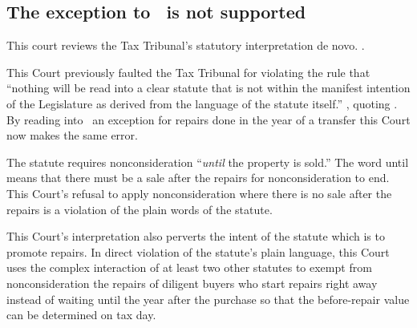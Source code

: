 \documentclass[12pt,\documentclassflag]{michiganCourtOfAppealsBrief}
\begin{document}
\subsection{The exception to \mathieuGast\ is not supported}

This court reviews the Tax Tribunal's statutory interpretation de novo. .

This Court previously faulted the Tax Tribunal for violating the rule that ``nothing will be read into a clear statute that is not within the manifest intention of the Legislature as derived from the language of the statute itself.'' , quoting . By reading into \mathieuGast\ an exception for repairs done in the year of a transfer this Court now makes the same error.


The statute requires nonconsideration ``\emph{until} the property is sold.'' The word until means that there must be a sale after the repairs for nonconsideration to end. This Court's refusal to apply nonconsideration where there is no sale after the repairs is a violation of the plain words of the statute.

This Court's interpretation also perverts the intent of the statute which is to promote repairs.
In direct violation of the statute's plain language, this Court uses the complex interaction of at least two other statutes to exempt from nonconsideration the repairs of diligent buyers who start repairs right away instead of waiting until the year after the purchase so that the before-repair value can be determined on tax day.


% 
\end{document}
